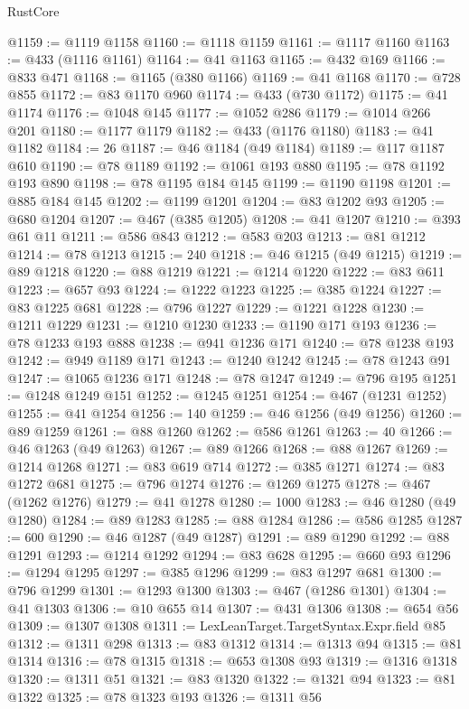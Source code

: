 \begin{lexlean}{RustCore}
\begin{coremodule}
@1159 := @1119 @1158
@1160 := @1118 @1159
@1161 := @1117 @1160
@1163 := @433 (@1116 @1161)
@1164 := @41 @1163
@1165 := @432 @169
@1166 := @833 @471
@1168 := @1165 (@380 @1166)
@1169 := @41 @1168
@1170 := @728 @855
@1172 := @83 @1170 @960
@1174 := @433 (@730 @1172)
@1175 := @41 @1174
@1176 := @1048 @145
@1177 := @1052 @286
@1179 := @1014 @266 @201
@1180 := @1177 @1179
@1182 := @433 (@1176 @1180)
@1183 := @41 @1182
@1184 := 26
@1187 := @46 @1184 (@49 @1184)
@1189 := @117 @1187 @610
@1190 := @78 @1189
@1192 := @1061 @193 @880
@1195 := @78 @1192 @193 @890
@1198 := @78 @1195 @184 @145
@1199 := @1190 @1198
@1201 := @885 @184 @145
@1202 := @1199 @1201
@1204 := @83 @1202 @93
@1205 := @680 @1204
@1207 := @467 (@385 @1205)
@1208 := @41 @1207
@1210 := @393 @61 @11
@1211 := @586 @843
@1212 := @583 @203
@1213 := @81 @1212
@1214 := @78 @1213
@1215 := 240
@1218 := @46 @1215 (@49 @1215)
@1219 := @89 @1218
@1220 := @88 @1219
@1221 := @1214 @1220
@1222 := @83 @611
@1223 := @657 @93
@1224 := @1222 @1223
@1225 := @385 @1224
@1227 := @83 @1225 @681
@1228 := @796 @1227
@1229 := @1221 @1228
@1230 := @1211 @1229
@1231 := @1210 @1230
@1233 := @1190 @171 @193
@1236 := @78 @1233 @193 @888
@1238 := @941 @1236 @171
@1240 := @78 @1238 @193
@1242 := @949 @1189 @171
@1243 := @1240 @1242
@1245 := @78 @1243 @91
@1247 := @1065 @1236 @171
@1248 := @78 @1247
@1249 := @796 @195
@1251 := @1248 @1249 @151
@1252 := @1245 @1251
@1254 := @467 (@1231 @1252)
@1255 := @41 @1254
@1256 := 140
@1259 := @46 @1256 (@49 @1256)
@1260 := @89 @1259
@1261 := @88 @1260
@1262 := @586 @1261
@1263 := 40
@1266 := @46 @1263 (@49 @1263)
@1267 := @89 @1266
@1268 := @88 @1267
@1269 := @1214 @1268
@1271 := @83 @619 @714
@1272 := @385 @1271
@1274 := @83 @1272 @681
@1275 := @796 @1274
@1276 := @1269 @1275
@1278 := @467 (@1262 @1276)
@1279 := @41 @1278
@1280 := 1000
@1283 := @46 @1280 (@49 @1280)
@1284 := @89 @1283
@1285 := @88 @1284
@1286 := @586 @1285
@1287 := 600
@1290 := @46 @1287 (@49 @1287)
@1291 := @89 @1290
@1292 := @88 @1291
@1293 := @1214 @1292
@1294 := @83 @628
@1295 := @660 @93
@1296 := @1294 @1295
@1297 := @385 @1296
@1299 := @83 @1297 @681
@1300 := @796 @1299
@1301 := @1293 @1300
@1303 := @467 (@1286 @1301)
@1304 := @41 @1303
@1306 := @10 @655 @14
@1307 := @431 @1306
@1308 := @654 @56
@1309 := @1307 @1308
@1311 := LexLeanTarget.TargetSyntax.Expr.field @85
@1312 := @1311 @298
@1313 := @83 @1312
@1314 := @1313 @94
@1315 := @81 @1314
@1316 := @78 @1315
@1318 := @653 @1308 @93
@1319 := @1316 @1318
@1320 := @1311 @51
@1321 := @83 @1320
@1322 := @1321 @94
@1323 := @81 @1322
@1325 := @78 @1323 @193
@1326 := @1311 @56

\end{coremodule}
\end{lexlean}
